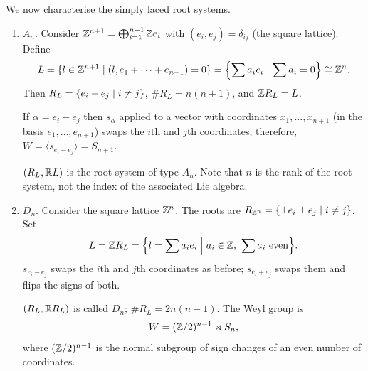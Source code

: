 We now characterise the simply laced root systems.
\begin{enumerate}
  \item $A_n$. Consider $\mathbb{Z}^{n+1} = \bigoplus_{i=1}^{n+1} \mathbb{Z} e_i$ with
    $(e_i, e_j) = \delta_{ij}$ (the square lattice). Define
    \[
      L = \{l \in \mathbb{Z}^{n+1} \mid (l, e_1 + \dots + e_{n+1}) = 0\}
        = \Bigl\{\sum a_ie_i \Bigm| \sum a_i = 0\Bigr\} \cong \mathbb{Z}^n.
    \]
    Then $R_L = \{e_i - e_j \mid i \neq j\}$, $\#R_L = n(n + 1)$, and
    $\mathbb{Z} R_L = L$.

    If $\alpha = e_i - e_j$ then $s_\alpha$ applied to a vector with
    coordinates $x_1, \dots, x_{n+1}$ (in the basis $e_1, \dots, e_{n+1}$)
    swaps the $i$th and $j$th coordinates; therefore,
    $W = \langle s_{e_i - e_j}\rangle = S_{n+1}$.

    $(R_L, \mathbb{R} L)$ is the root system of type $A_n$. Note that $n$ is the rank
    of the root system, not the index of the associated Lie algebra.

    \begin{exercise}\leavevmode
    \end{exercise}
  \item $D_n$. Consider the square lattice $\mathbb{Z}^n$. The roots are
    $R_{\mathbb{Z}^n} = \{\pm e_i \pm e_j \mid i \neq j\}$. Set
    \[
      L = \mathbb{Z} R_L = \Bigl\{ l = \sum a_ie_i \Bigm| a_i \in \mathbb{Z},\ \sum a_i \text{ even} \Bigr\}.
    \]
    $s_{e_i - e_j}$ swaps the $i$th and $j$th coordinates as before;
    $s_{e_i + e_j}$ swaps them and flips the signs of both.

    $(R_L, \mathbb{R} R_L)$ is called $D_n$; $\#R_L = 2n(n - 1)$. The Weyl group is
    \[
      W = (\mathbb{Z}/2)^{n-1} \rtimes S_n,
    \]
    where $(\mathbb{Z}/2)^{n-1}$ is the normal subgroup of sign changes of an even
    number of coordinates.

    \begin{exercise}\leavevmode
    \end{exercise}
\end{enumerate}

